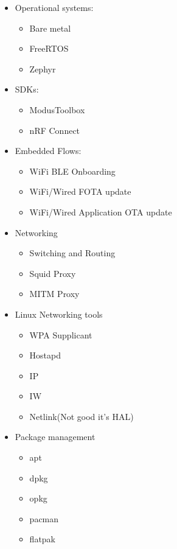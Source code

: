 \begin{itemize}
    \item Operational systems:
    \begin{itemize}
        \item Bare metal
        \item FreeRTOS
        \item Zephyr
    \end{itemize}

    \item SDKs:
    \begin{itemize}
        \item ModusToolbox
        \item nRF Connect
    \end{itemize}

    \item Embedded Flows:
    \begin{itemize}
        \item WiFi BLE Onboarding
        \item WiFi/Wired FOTA update
        \item WiFi/Wired Application OTA update
    \end{itemize}

    \item Networking
    \begin{itemize}
        \item Switching and Routing
        \item Squid Proxy
        \item MITM Proxy
    \end{itemize}

    \item Linux Networking tools
    \begin{itemize}
        \item WPA Supplicant
        \item Hostapd
        \item IP
        \item IW
        \item Netlink(Not good it's HAL)
    \end{itemize}

    \item Package management
    \begin{itemize}
        \item apt
        \item dpkg
        \item opkg
        \item pacman
        \item flatpak
    \end{itemize}


\end{itemize}
